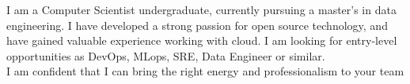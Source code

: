 \documentclass[letter,10pt]{article}
\begin{document}



I am a Computer Scientist undergraduate, currently pursuing a master's in data engineering. I have developed a strong passion for open source technology, and have gained valuable experience working with cloud. I am looking for entry-level opportunities as DevOps, MLops, SRE, Data Engineer or similar. \\
I am confident that I can bring the right energy and professionalism to your team


\end{document}
